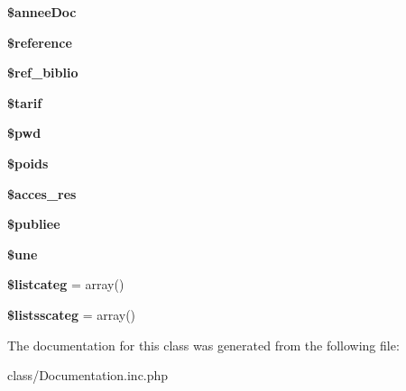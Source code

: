 \begin{DoxyCompactItemize}
\item 
\hypertarget{class_documentation_ac9b06907fb28a442d55f9bf7ac6de157}{
{\bfseries \$anneeDoc}}
\label{class_documentation_ac9b06907fb28a442d55f9bf7ac6de157}

\item 
\hypertarget{class_documentation_a00cd570b95d8112d16e723e2a4052159}{
{\bfseries \$reference}}
\label{class_documentation_a00cd570b95d8112d16e723e2a4052159}

\item 
\hypertarget{class_documentation_a3c0fd9b5d63b8adb73f4771ad1e0f8b4}{
{\bfseries \$ref\_\-biblio}}
\label{class_documentation_a3c0fd9b5d63b8adb73f4771ad1e0f8b4}

\item 
\hypertarget{class_documentation_afe2d62dbbc1439cc8585355528a59643}{
{\bfseries \$tarif}}
\label{class_documentation_afe2d62dbbc1439cc8585355528a59643}

\item 
\hypertarget{class_documentation_a4a94bc34a1cd0162d1603b120d8f8a80}{
{\bfseries \$pwd}}
\label{class_documentation_a4a94bc34a1cd0162d1603b120d8f8a80}

\item 
\hypertarget{class_documentation_a030ea248669387027e5844acb71a962a}{
{\bfseries \$poids}}
\label{class_documentation_a030ea248669387027e5844acb71a962a}

\item 
\hypertarget{class_documentation_a7823659510fda59120181abf5dcc7fc8}{
{\bfseries \$acces\_\-res}}
\label{class_documentation_a7823659510fda59120181abf5dcc7fc8}

\item 
\hypertarget{class_documentation_aa6fb7b433cf943ac1480bca87906e9af}{
{\bfseries \$publiee}}
\label{class_documentation_aa6fb7b433cf943ac1480bca87906e9af}

\item 
\hypertarget{class_documentation_a02babc043879f3387ac612a5b24f74a6}{
{\bfseries \$une}}
\label{class_documentation_a02babc043879f3387ac612a5b24f74a6}

\item 
\hypertarget{class_documentation_ab5b9bf159868eda9b221b6277b12ef75}{
{\bfseries \$listcateg} = array()}
\label{class_documentation_ab5b9bf159868eda9b221b6277b12ef75}

\item 
\hypertarget{class_documentation_a04a079a5b31774997197e28730fe79fa}{
{\bfseries \$listsscateg} = array()}
\label{class_documentation_a04a079a5b31774997197e28730fe79fa}

\end{DoxyCompactItemize}


The documentation for this class was generated from the following file:\begin{DoxyCompactItemize}
\item 
class/Documentation.inc.php\end{DoxyCompactItemize}
